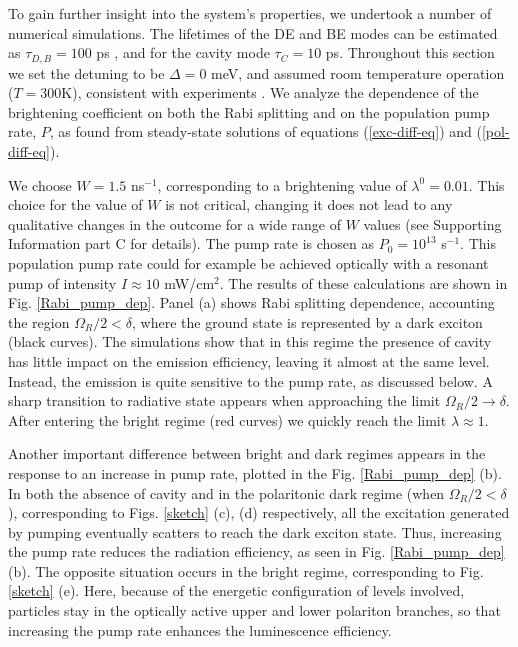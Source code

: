 \documentclass[journal=aamick,manuscript=article]{achemso}
\begin{document}
To gain further insight into the system's properties, we undertook a number of numerical simulations.
The lifetimes of the DE and BE modes can be estimated as $\tau_{D,B}=100$ ps \cite{Perebeinos2008}, and for the cavity mode $\tau_C=10$ ps.
Throughout this section we set the detuning to be $\Delta=0$ meV, and assumed room temperature operation ($T=300$K), consistent with experiments \cite{Zakharko2016}.
We analyze the dependence of the brightening coefficient on both the Rabi splitting and on the population pump rate, $P$, as found from steady-state solutions of equations (\ref{exc-diff-eq}) and (\ref{pol-diff-eq}). 

We choose $W=1.5$ ns$^{-1}$, corresponding to a brightening value of $\lambda^0=0.01$. This choice for the value of $W$ is not critical, changing it does not lead to any qualitative changes in the outcome for a wide range of $W$ values (see Supporting Information part C for details).
The pump rate is chosen as $P_0=10^{13}$ s$^{-1}$.
This population pump rate could for example be achieved optically with a resonant pump of intensity $I\approx 10$ mW/cm$^2$. 
The results of these calculations are shown in Fig. \ref{Rabi_pump_dep}. Panel (a) shows Rabi splitting dependence, accounting the region  $\Omega_R/2 < \delta$,  where the ground state is represented by a dark exciton (black curves).
The simulations show that in this regime the presence of cavity has little impact on the emission efficiency, leaving it almost at the same level.
Instead, the emission is quite sensitive to the pump rate, as discussed below.  
A sharp transition to radiative state appears when approaching the limit $\Omega_R/2\rightarrow \delta$. After entering the bright regime (red curves) we quickly reach the limit $\lambda\approx 1$.  

Another important difference between bright and dark regimes appears in the response to an increase in pump rate, plotted in the Fig. \ref{Rabi_pump_dep} (b). In both the absence of cavity and in the polaritonic dark regime (when $\Omega_R/2<\delta$), corresponding to Figs. \ref{sketch} (c), (d) respectively, all the excitation generated by pumping eventually scatters to reach the dark exciton state. Thus, increasing the pump rate reduces the radiation efficiency, as seen in Fig. \ref{Rabi_pump_dep} (b).  The opposite situation occurs in the bright regime, corresponding to Fig. \ref{sketch} (e). Here, because of the energetic configuration of levels involved, particles stay in the optically active upper and lower polariton branches, so that increasing the pump rate enhances the luminescence efficiency.
\end{document}
